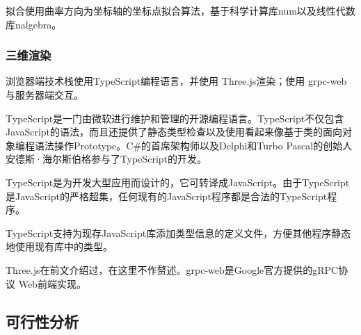 拟合使用曲率方向为坐标轴的坐标点拟合算法，基于科学计算库num以及线性代数库nalgebra。

\subsubsection{三维渲染}

浏览器端技术栈使用TypeScript编程语言，并使用 Three.js渲染；使用 grpc-web 与服务器端交互。

TypeScript是一门由微软进行维护和管理的开源编程语言。TypeScript不仅包含JavaScript的语法，而且还提供了静态类型检查以及使用看起来像基于类的面向对象编程语法操作Prototype。C#的首席架构师以及Delphi和Turbo Pascal的创始人安德斯·海尔斯伯格参与了TypeScript的开发。

TypeScript是为开发大型应用而设计的，它可转译成JavaScript。由于TypeScript是JavaScript的严格超集，任何现有的JavaScript程序都是合法的TypeScript程序。

TypeScript支持为现存JavaScript库添加类型信息的定义文件，方便其他程序静态地使用现有库中的类型。

Three.js在前文介绍过，在这里不作赘述。grpc-web是Google官方提供的gRPC协议 Web前端实现。

\subsection{可行性分析}
